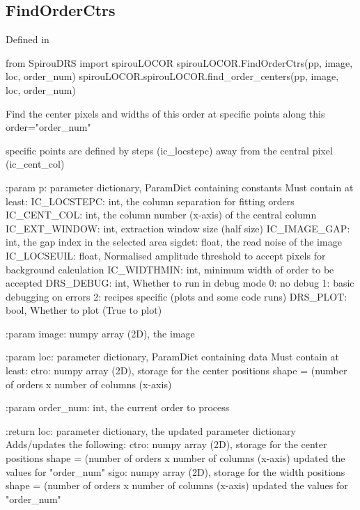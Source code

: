 \begin{minipage}{\textwidth}
\subsection{FindOrderCtrs}

Defined in \spirouLOCOR{}

\begin{pythonbox}
from SpirouDRS import spirouLOCOR
spirouLOCOR.FindOrderCtrs(pp, image, loc, order_num)
spirouLOCOR.spirouLOCOR.find_order_centers(pp, image, loc, order_num)
\end{pythonbox}

\begin{pythondocstring}
Find the center pixels and widths of this order at specific points
along this order="order_num"

specific points are defined by steps (ic_locstepc) away from the
central pixel (ic_cent_col)

:param p: parameter dictionary, ParamDict containing constants
    Must contain at least:
            IC_LOCSTEPC: int, the column separation for fitting orders
            IC_CENT_COL: int, the column number (x-axis) of the central
                         column
            IC_EXT_WINDOW: int, extraction window size (half size)
            IC_IMAGE_GAP: int, the gap index in the selected area
            sigdet: float, the read noise of the image
            IC_LOCSEUIL: float, Normalised amplitude threshold to accept
                         pixels for background calculation
            IC_WIDTHMIN: int, minimum width of order to be accepted
            DRS_DEBUG: int, Whether to run in debug mode
                            0: no debug
                            1: basic debugging on errors
                            2: recipes specific (plots and some code runs)
            DRS_PLOT: bool, Whether to plot (True to plot)

:param image: numpy array (2D), the image

:param loc: parameter dictionary, ParamDict containing data
        Must contain at least:
            ctro: numpy array (2D), storage for the center positions
                  shape = (number of orders x number of columns (x-axis)

:param order_num: int, the current order to process

:return loc: parameter dictionary, the updated parameter dictionary
        Adds/updates the following:
            ctro: numpy array (2D), storage for the center positions
                  shape = (number of orders x number of columns (x-axis)
                  updated the values for "order_num"
            sigo: numpy array (2D), storage for the width positions
                  shape = (number of orders x number of columns (x-axis)
                  updated the values for "order_num"
\end{pythondocstring}
\end{minipage}

